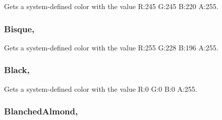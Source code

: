 Gets a system-\/defined color with the value R\+:245 G\+:245 B\+:220 A\+:255.

\hypertarget{structMicrosoft_1_1Xna_1_1Framework_1_1Color_a27f39ca0f86138a9978d54ba8d59768f}{}
\subsubsection[{Bisque}]{ Bisque\hspace{0.3cm}{\ttfamily [static]}, {\ttfamily [get]}}\label{structMicrosoft_1_1Xna_1_1Framework_1_1Color_a27f39ca0f86138a9978d54ba8d59768f}


Gets a system-\/defined color with the value R\+:255 G\+:228 B\+:196 A\+:255.

\hypertarget{structMicrosoft_1_1Xna_1_1Framework_1_1Color_a490360be3af8e93c455d892cb7a05dd9}{}
\subsubsection[{Black}]{ Black\hspace{0.3cm}{\ttfamily [static]}, {\ttfamily [get]}}\label{structMicrosoft_1_1Xna_1_1Framework_1_1Color_a490360be3af8e93c455d892cb7a05dd9}


Gets a system-\/defined color with the value R\+:0 G\+:0 B\+:0 A\+:255.

\hypertarget{structMicrosoft_1_1Xna_1_1Framework_1_1Color_a605c9878e0f8b2f5f510c993b7b249f7}{}
\subsubsection[{Blanched\+Almond}]{ Blanched\+Almond\hspace{0.3cm}{\ttfamily [static]}, {\ttfamily [get]}}\label{structMicrosoft_1_1Xna_1_1Framework_1_1Color_a605c9878e0f8b2f5f510c993b7b249f7}


